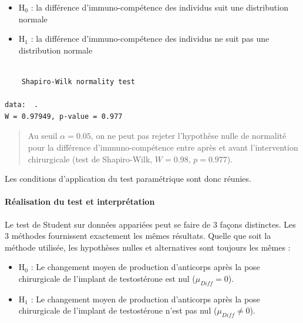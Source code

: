 \documentclass[a4paperpaper,]{article}
\newenvironment{Shaded}{\begin{snugshade}}{\end{snugshade}}
\newcommand{\KeywordTok}[1]{\textcolor[rgb]{0.12,0.11,0.11}{\textbf{#1}}}
\newcommand{\NormalTok}[1]{\textcolor[rgb]{0.12,0.11,0.11}{#1}}
\newcommand{\OperatorTok}[1]{\textcolor[rgb]{0.12,0.11,0.11}{#1}}
\newcommand{\StringTok}[1]{\textcolor[rgb]{0.75,0.01,0.01}{#1}}
\providecommand{\tightlist}{%
  \setlength{\itemsep}{0pt}\setlength{\parskip}{0pt}}
\let\oldparagraph\paragraph
\renewcommand{\paragraph}[1]{\oldparagraph{#1}\mbox{}}
\begin{document}
\begin{itemize}
\tightlist
\item
  H\(_0\) : la différence d'immuno-compétence des individus suit une distribution normale
\item
  H\(_1\) : la différence d'immuno-compétence des individus ne suit pas une distribution normale
\end{itemize}

\begin{Shaded}
\end{Shaded}

\begin{verbatim}

    Shapiro-Wilk normality test

data:  .
W = 0.97949, p-value = 0.977
\end{verbatim}

\begin{quote}
Au seuil \(\alpha = 0.05\), on ne peut pas rejeter l'hypothèse nulle de normalité pour la différence d'immuno-compétence entre après et avant l'intervention chirurgicale (test de Shapiro-Wilk, \(W = 0.98\), \(p = 0.977\)).
\end{quote}

Les conditions d'application du test paramétrique sont donc réunies.

\hypertarget{realisation-du-test-et-interpretation-1}{%
\paragraph{Réalisation du test et interprétation}\label{realisation-du-test-et-interpretation-1}}

Le test de Student sur données appariées peut se faire de 3 façons distinctes. Les 3 méthodes fournissent exactement les mêmes résultats. Quelle que soit la méthode utilisée, les hypothèses nulles et alternatives sont toujours les mêmes :

\begin{itemize}
\tightlist
\item
  H\(_0\) : Le changement moyen de production d'anticorps après la pose chirurgicale de l'implant de testostérone est nul (\(\mu_{Diff} = 0\)).
\item
  H\(_1\) : Le changement moyen de production d'anticorps après la pose chirurgicale de l'implant de testostérone n'est pas nul (\(\mu_{Diff} \neq 0\)).
\end{itemize}
\end{document}

